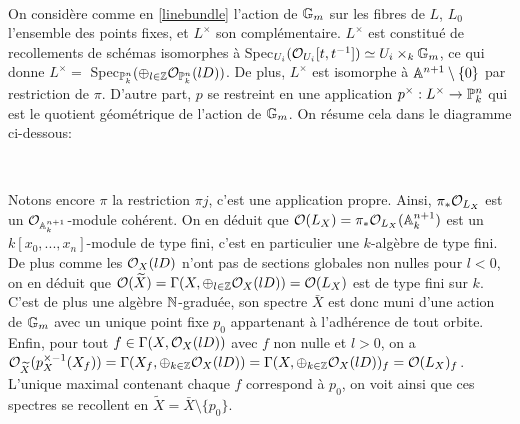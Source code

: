 	\begin{center}
	\\
	\end{center}


On considère comme en \ref{linebundle} l'action de $\mathbb{G}_m$ sur les fibres de $L$, $L_0$ l'ensemble des points fixes, et $L^\times$ son complémentaire. $L^\times$ est constitué de recollements de schémas isomorphes à Spec$_{U_i}( \mathcal{O}_{U_i}[t,t^{-1}])\simeq U_i \times_k \mathbb{G}_m$, ce qui donne $L^\times=$ Spec$_{\mathbb{P}^n_k}(\oplus_{l\in \mathbb{Z}}\mathcal{O}_{\mathbb{P}^n_k}(lD))$. De plus, $L^\times$ est isomorphe à $\mathbb{A}^{n+1}\setminus\lbrace 0 \rbrace$ par restriction de $\pi$. D'autre part, $p$ se restreint en une application $p^\times:L^\times \rightarrow \mathbb{P}^n_k$ qui est le quotient géométrique de l'action de $\mathbb{G}_m$. On résume cela dans le diagramme ci-dessous:

	\begin{center}
	\\
	\end{center}

Notons encore $\pi$ la restriction $\pi j$, c'est une application propre. Ainsi, $\pi_*\mathcal{O}_{L_X}$ est un $\mathcal{O}_{\mathbb{A}_k^{n+1}}$-module cohérent. On en déduit que $\mathcal{O}(L_X)=\pi_*\mathcal{O}_{L_X}(\mathbb{A}_k^{n+1})$ est un $k[x_0,...,x_n]$-module de type fini, c'est en particulier une $k$-algèbre de type fini. De plus comme les $\mathcal{O}_X(lD)$ n'ont pas de sections globales non nulles pour $l<0$, on en déduit que $\mathcal{O}(\widetilde{X})=\Gamma(X,\oplus_{l\in \mathbb{Z}}\mathcal{O}_X(lD))=\mathcal{O}(L_X)$ est de type fini sur $k$. C'est de plus une algèbre $\mathbb{N}$-graduée, son spectre $\bar{X}$ est donc muni d'une action de $\mathbb{G}_m$ avec un unique point fixe $p_0$ appartenant à l'adhérence de tout orbite. Enfin, pour tout $f\in \Gamma(X,\mathcal{O}_X(lD))$ avec $f$ non nulle et $l>0$, on a  $\mathcal{O}_{\widetilde{X}}(p_X^{\times-1}(X_f))=\Gamma(X_f,\oplus_{k\in \mathbb{Z}}\mathcal{O}_X(lD))=\Gamma(X,\oplus_{k\in \mathbb{Z}}\mathcal{O}_X(lD))_f=\mathcal{O}(L_X)_f$. L'unique maximal contenant chaque $f$ correspond à $p_0$, on voit ainsi que ces spectres se recollent en $\widetilde{X}=\bar{X}\setminus \lbrace p_0 \rbrace$.\\

